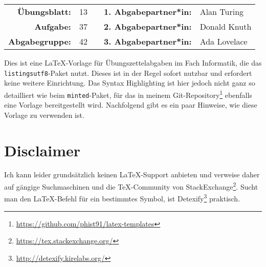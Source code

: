
\newcommand{\obenlinks}{Name der Vorlesung}		%

\begin{center}
	\begin{tabular}{|rlp{4cm}rl|}
	\hline
	 \textbf{Übungsblatt:} & 13 &  & \textbf{1. Abgabepartner*in:} & Alan Turing  \\
	     \textbf{Aufgabe:} & 37 &  & \textbf{2. Abgabepartner*in:} & Donald Knuth \\
	\textbf{Abgabegruppe:} & 42 &  & \textbf{3. Abgabepartner*in:} & Ada Lovelace \\ \hline
\end{tabular}
\end{center} 

Dies ist eine \LaTeX-Vorlage für Übungszettelabgaben im Fach Informatik, die das \texttt{listingsutf8}-Paket nutzt.
Dieses ist in der Regel sofort nutzbar und erfordert keine weitere Einrichtung.
Das Syntax Highlighting ist hier jedoch nicht ganz so detailliert wie beim \texttt{minted}-Paket, für das in meinem Git-Repository\footnote{\url{https://github.com/phist91/latex-templates}} ebenfalls eine Vorlage bereitgestellt wird.
Nachfolgend gibt es ein paar Hinweise, wie diese Vorlage zu verwenden ist.

\section*{Disclaimer}
Ich kann leider grundsätzlich keinen \LaTeX-Support anbieten und verweise daher auf gängige Suchmaschinen und die \TeX-Community von StackExchange\footnote{\url{https://tex.stackexchange.org/}}.		
Sucht man den LaTeX-Befehl für ein bestimmtes Symbol, ist Detexify\footnote{\url{http://detexify.kirelabs.org/}} praktisch.

